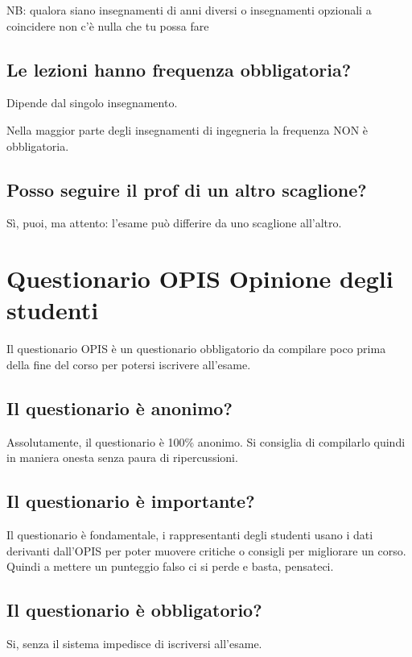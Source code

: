 \documentclass[legal]{polinetwork}
\begin{document}
NB: qualora siano insegnamenti di anni diversi o insegnamenti opzionali a coincidere non c’è nulla che tu possa fare

\subsection{Le lezioni hanno frequenza obbligatoria?}


Dipende dal singolo insegnamento.

Nella maggior parte degli insegnamenti di ingegneria la frequenza NON è obbligatoria.

\subsection{Posso seguire il prof di un altro scaglione?}


Sì, puoi, ma attento: l'esame può differire da uno scaglione all'altro.

\section{Questionario OPIS Opinione degli studenti}


Il questionario OPIS è un questionario obbligatorio da compilare poco prima della fine del corso per potersi iscrivere all'esame.

\subsection{Il questionario è anonimo?}


Assolutamente, il questionario è 100\% anonimo. Si consiglia di compilarlo quindi in maniera onesta senza paura di ripercussioni.

\subsection{Il questionario è importante?}


Il questionario è fondamentale, i rappresentanti degli studenti usano i dati derivanti dall'OPIS per poter muovere critiche o consigli per migliorare un corso. Quindi a mettere un punteggio falso ci si perde e basta, pensateci.

\subsection{Il questionario è obbligatorio?}


Si, senza il sistema impedisce di iscriversi all'esame.
\end{document}
